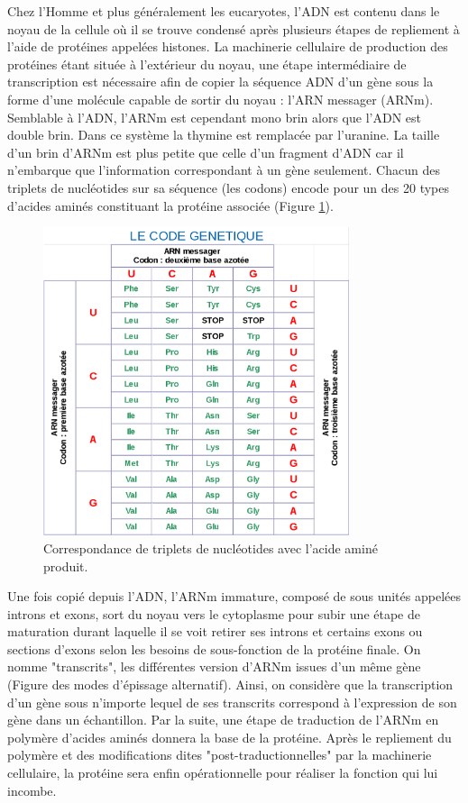 Chez l'Homme et plus généralement les eucaryotes, l'ADN est contenu dans le noyau de la cellule où il se trouve condensé après plusieurs étapes de repliement à l'aide de protéines appelées histones. La machinerie cellulaire de production des protéines étant située à l'extérieur du noyau, une étape intermédiaire de transcription est nécessaire afin de copier la séquence ADN d'un gène sous la forme d'une molécule capable de sortir du noyau : l'ARN messager (ARNm). Semblable à l'ADN, l'ARNm est cependant mono brin alors que l'ADN est double brin. Dans ce système la thymine est remplacée par l'uranine. La taille d'un brin d'ARNm est plus petite que celle d'un fragment d'ADN car il n'embarque que l'information correspondant à un gène seulement. Chacun des triplets de nucléotides sur sa séquence (les codons) encode pour un des 20 types d'acides aminés constituant la protéine associée (Figure \ref{fig:intro_code_genetique}).

\begin{figure}[!ht]
    \centering
    \includegraphics[width=0.8\textwidth]{img/intro/code_genetique.png}
    \caption{Correspondance de triplets de nucléotides avec l'acide aminé produit.}
    \label{fig:intro_code_genetique}
\end{figure}


Une fois copié depuis l'ADN, l'ARNm immature, composé de sous unités appelées introns et exons, sort du noyau vers le cytoplasme pour subir une étape de maturation durant laquelle il se voit retirer ses introns et certains exons ou sections d'exons selon les besoins de sous-fonction de la protéine finale. On nomme "transcrits", les différentes version d'ARNm issues d'un même gène (Figure des modes d'épissage alternatif). Ainsi, on considère que la transcription d'un gène sous n'importe lequel de ses transcrits correspond à l'expression de son gène dans un échantillon. Par la suite, une étape de traduction de l'ARNm en polymère d'acides aminés donnera la base de la protéine. Après le repliement du polymère et des modifications dites "post-traductionnelles" par la machinerie cellulaire, la protéine sera enfin opérationnelle pour réaliser la fonction qui lui incombe. 



